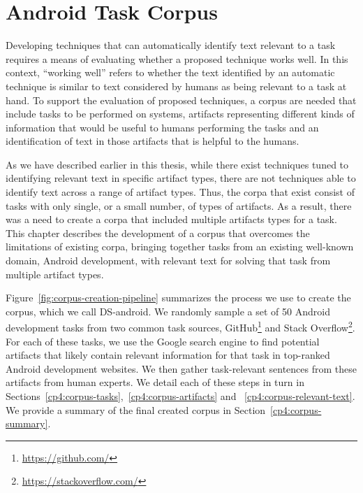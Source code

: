 \setcounter{chapter}{3}
\setcounter{rq}{1}


\chapter{Android Task Corpus}
\label{ch:android-corpus}




Developing techniques that can automatically identify text
relevant to a task requires a means of evaluating whether
a proposed technique works well. In this context,
``working well'' refers to whether the text identified
by an automatic technique is similar to text considered
by humans as being relevant to a task at hand. To support
the evaluation of proposed techniques, a corpus
are needed that include tasks to be performed on
systems, artifacts representing different kinds of information
that would be useful to humans performing the tasks
and an identification of text in those artifacts that
is helpful to the humans.

As we have described earlier in this thesis, while there
exist techniques tuned to identifying relevant text in
specific artifact types, there are not techniques able to
identify text across a range of artifact types. Thus,
the corpa that exist consist of tasks with only single,
or a small number, of types of artifacts. As a result,
there was a need to create a corpa that included
multiple artifacts types for a task. This chapter describes the
development of a corpus that overcomes the limitations of
existing corpa, bringing together tasks from an existing
well-known domain, Android development, with relevant text
for solving that task from multiple artifact types.


Figure~\ref{fig:corpus-creation-pipeline}
summarizes the process we use to create the corpus, which we call \acs{DS-android}.
We randomly sample a set of 50 Android development tasks from two common
task sources, GitHub\footnote{\url{https://github.com/}} and Stack Overflow\footnote{\url{https://stackoverflow.com/}}.
For each of these tasks, we use the Google search engine to find potential artifacts that likely contain relevant
information for that task in top-ranked Android development websites. 
We then gather task-relevant sentences from these artifacts
from human experts.
We detail each of these steps in turn in 
Sections~\ref{cp4:corpus-tasks},~\ref{cp4:corpus-artifacts} and ~\ref{cp4:corpus-relevant-text}.
We provide a summary of the final created corpus in Section~\ref{cp4:corpus-summary}.




